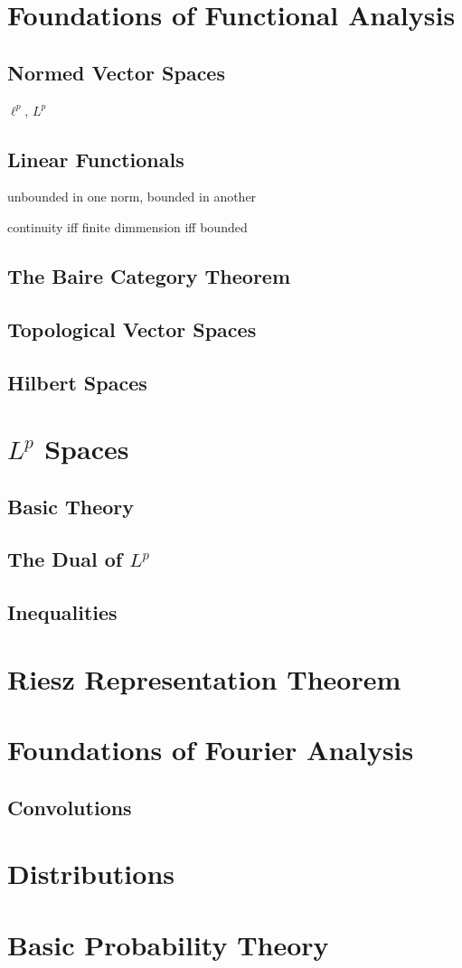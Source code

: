 \documentclass{article}
\theoremstyle{definition}
\begin{document}
\section{Foundations of Functional Analysis}
\subsection{Normed Vector Spaces}
$ \ell^p $, $ L^p $
\subsection{Linear Functionals}
unbounded in one norm, bounded in another %

continuity iff finite dimmension iff bounded
\subsection{The Baire Category Theorem}
\subsection{Topological Vector Spaces}
\subsection{Hilbert Spaces}
\section{$ L^p $ Spaces}
\subsection{Basic Theory}
\subsection{The Dual of $ L^p $}
\subsection{Inequalities}
\section{Riesz Representation Theorem}
\section{Foundations of Fourier Analysis}
\subsection{Convolutions}
\section{Distributions}
\section{Basic Probability Theory}
\newpage
{} 
\end{document}
